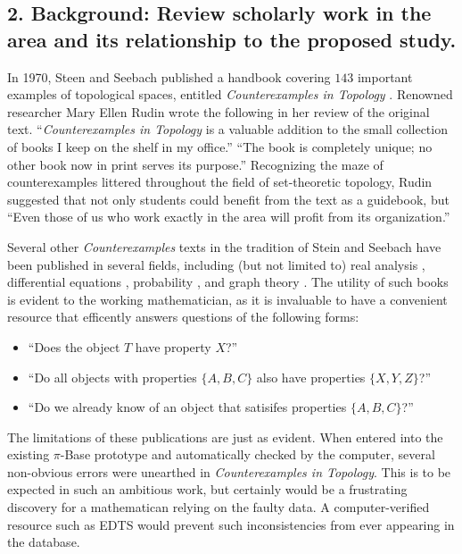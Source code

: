 \documentclass[11pt]{article}
\begin{document}
\subsection*{2. Background:  Review scholarly work in the area and its relationship to the proposed study.}

In 1970, Steen and Seebach published a handbook
covering \(143\) important examples of topological spaces, entitled
\textit{Counterexamples in Topology} \cite{MR1382863}. Renowned researcher
Mary Ellen Rudin wrote the following in her review \cite{MR1536430}
of the original text.
``\textit{Counterexamples in Topology} is a valuable addition to the small
collection of books I keep on the shelf in my office.'' ``The book is
completely unique; no other book now in print serves its purpose.''
Recognizing the maze of counterexamples littered throughout the
field of set-theoretic topology, Rudin suggested that not only students could
benefit from the text as a guidebook, but
``Even those of us who work exactly in the area will profit from
its organization.''

Several other \textit{Counterexamples} texts
in the tradition of Stein and Seebach have been published in several fields,
including (but not limited to) real analysis \cite{MR1256489}, differential
equations \cite{MR1113487}, probability \cite{MR930671}, and
graph theory \cite{MR0491272}.
The utility of such books is evident to the working mathematician, as it is
invaluable to have a convenient resource that efficently
answers questions of the following forms:
\begin{itemize}
  \item ``Does the object \(T\) have property \(X\)?''
  \item ``Do all objects with properties \(\{A,B,C\}\) also have properties
          \(\{X,Y,Z\}\)?''
  \item ``Do we already know of an object that satisifes properties
          \(\{A,B,C\}\)?''
\end{itemize}

The limitations of these publications are just as evident. When entered into
the existing \(\pi\)-Base prototype and automatically checked by the computer,
several non-obvious errors were unearthed in
\textit{Counterexamples in Topology}. This is to be
expected in such an ambitious work, but certainly would be a frustrating
discovery for a mathematican relying on the faulty data. A computer-verified
resource such as EDTS would prevent such inconsistencies from ever appearing
in the database.
\end{document}
